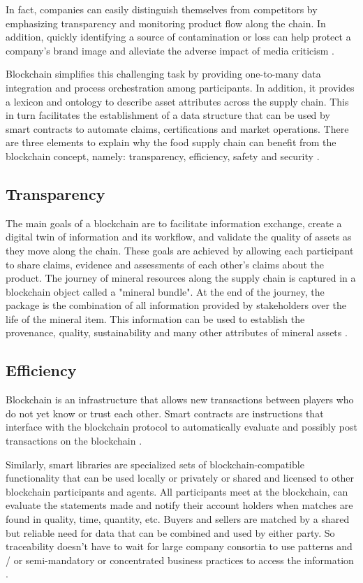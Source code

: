 In fact, companies can easily distinguish themselves from competitors by emphasizing transparency and monitoring product flow along the chain. In addition, quickly identifying a source of contamination or loss can help protect a company's brand image \cite{mejia2010traceability} and alleviate the adverse impact of media criticism \cite{dabbene2011food}.

Blockchain simplifies this challenging task by providing one-to-many data integration and process orchestration among participants. In addition, it provides a lexicon and ontology to describe asset attributes across the supply chain. This in turn facilitates the establishment of a data structure that can be used by smart contracts to automate claims, certifications and market operations. There are three elements to explain why the food supply chain can benefit from the blockchain concept, namely: transparency, efficiency, safety and security \cite{galvez2018future}.

\subsection{Transparency}\label{sec:transparency}

The main goals of a blockchain are to facilitate information exchange, create a digital twin of information and its workflow, and validate the quality of assets as they move along the chain. These goals are achieved by allowing each participant to share claims, evidence and assessments of each other's claims about the product. The journey of mineral resources along the supply chain is captured in a blockchain object called a "mineral bundle". At the end of the journey, the package is the combination of all information provided by stakeholders over the life of the mineral item. This information can be used to establish the provenance, quality, sustainability and many other attributes of mineral assets \cite{martin2017technology}.

\subsection{Efficiency}\label{sec:efficiency}
Blockchain is an infrastructure that allows new transactions between players who do not yet know or trust each other. Smart contracts are instructions that interface with the blockchain protocol to automatically evaluate and possibly post transactions on the blockchain \cite{raskin2017law}. 

Similarly, smart libraries are specialized sets of blockchain-compatible functionality that can be used locally or privately or shared and licensed to other blockchain participants and agents. All participants meet at the blockchain, can evaluate the statements made and notify their account holders when matches are found in quality, time, quantity, etc. Buyers and sellers are matched by a shared but reliable need for data that can be combined and used by either party. So traceability doesn't have to wait for large company consortia to use patterns and / or semi-mandatory or concentrated business practices to access the information \cite{galvez2018future}.

